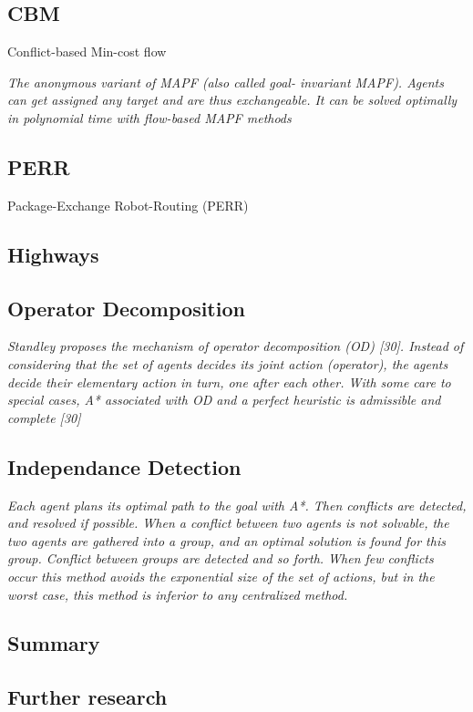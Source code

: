 \documentclass[a4paper,11pt]{article}
\begin{document}
\subsection{CBM}
Conflict-based Min-cost flow

\textit{The anonymous variant of MAPF (also called goal- invariant MAPF). Agents can get assigned any target and are thus exchangeable. It can be solved optimally in polynomial time with flow-based MAPF methods}

\subsection{PERR}
Package-Exchange Robot-Routing (PERR)

\subsection{Highways}
\cite{cohen2016bounded}

\subsection{Operator Decomposition}
\textit{Standley proposes the mechanism of operator decomposition (OD) [30]. Instead of considering that the set of agents decides its joint action (operator), the agents decide their elementary action in turn, one after each other. With some care to special cases, A* associated with OD and a perfect heuristic is admissible and complete [30]}

\subsection{Independance Detection}
\textit{Each agent plans its optimal path to the goal with A*. Then conflicts are detected, and resolved if possible. When a conflict between two agents is not solvable, the two agents are gathered into a group, and an optimal solution is found for this group. Conflict between groups are detected and so forth. When few conflicts occur this method avoids the exponential size of the set of actions, but in the worst case, this method is inferior to any centralized method.}



\subsection{Summary}


\subsection{Further research}




\end{document}
